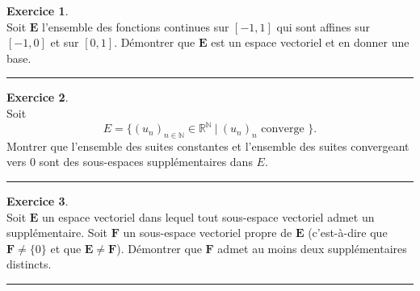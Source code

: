 \documentclass[a4paper,10pt]{article}
\theoremstyle{definition}
\theoremstyle{definition}
\newtheorem{exo}{Exercice}
\newcommand{\R}{\mathbb{R}}
\newcommand{\N}{\mathbb{N}}
\begin{document}
\begin{minipage}{1\linewidth}
\begin{minipage}[t]{0.48\linewidth}
\begin{exo}\quad\\
	Soit $\mathbf{E}$ l'ensemble des fonctions continues sur $[-1,1]$ qui sont affines sur $[-1,0]$ et sur $[0,1]$. Démontrer que $\mathbf{E}$ est un espace vectoriel et en donner une base.
	
	\centering
	\rule{1\linewidth}{0.6pt}
\end{exo}
	\begin{exo}\quad\\
	Soit $$E=\big\{(u_{n})_{n\in
		\N}\in \R^{\N}\ |\ (u_{n})_{n} \text{ converge }\big\}.$$
	Montrer que
	l'ensemble des suites constantes et l'ensemble des suites convergeant
	vers $0$ sont des sous-espaces suppl\'{e}mentaires dans $E.$
		
	\centering
	\rule{1\linewidth}{0.6pt}
\end{exo}

		\begin{exo}\quad\\
	Soit $\mathbf{E}$ un espace vectoriel dans lequel tout sous-espace vectoriel admet un supplémentaire. Soit $\mathbf{F}$ un sous-espace vectoriel propre de $\mathbf{E}$ (c'est-à-dire que $\mathbf{F}\neq \{0\}$ et que $\mathbf{E}\neq \mathbf{F}$). Démontrer que $\mathbf{F}$ admet au moins deux supplémentaires distincts.
	
	\centering
	\rule{1\linewidth}{0.6pt}
\end{exo}



	
	\end{minipage}
\end{minipage}
\end{document}
